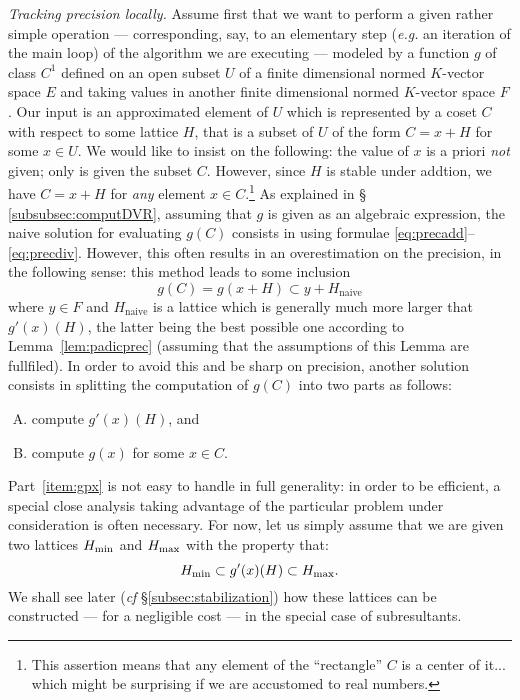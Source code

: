 \documentclass{jT}
\numberwithin{equation}{section}
\theoremstyle{definition}
\renewcommand{\min}{\text{\rm min}}
\renewcommand{\max}{\text{\rm max}}
\begin{document}
\noindent
\textit{Tracking precision locally.}
%
Assume first that we want to perform a given rather simple operation --- 
corresponding, say, to an elementary step (\emph{e.g.} an iteration of 
the main loop) of the algorithm we are executing --- modeled by a 
function $g$ of class $C^1$ defined on an open subset $U$ of a finite 
dimensional normed $K$-vector space $E$ and taking values in another 
finite dimensional normed $K$-vector space $F$.
Our input is an approximated element of $U$ which is represented 
by a coset $C$ with respect to some lattice $H$, that is a subset of $U$ 
of the form $C = x+H$ for some $x \in U$. We would like to insist on the 
following: the value of $x$ is a priori \emph{not} given; only is given 
the subset $C$. However, since $H$ is stable under addtion, we have $C = 
x+H$ for \emph{any} element $x \in C$.\footnote{This assertion means that 
any element of the ``rectangle'' $C$ is a center of it... which might be 
surprising if we are accustomed to real numbers.} As explained in \S 
\ref{subsubsec:computDVR}, assuming that $g$ is given as an algebraic 
expression, the naive solution for evaluating $g(C)$ consists in using 
formulae \eqref{eq:precadd}--\eqref{eq:precdiv}. However, this often 
results in an overestimation on the precision, in the following sense: 
this method leads to some inclusion
$$g(C) = g(x+H) \subset y + H_{\text{naive}}$$
where $y \in F$ and $H_{\text{naive}}$ is a lattice which is generally 
much more larger that $g'(x)(H)$, the latter being the best possible
one according to
Lemma~\ref{lem:padicprec} (assuming that the assumptions of this Lemma
are fullfiled). In order to avoid this and be sharp on
precision, another solution consists in splitting the computation of 
$g(C)$ into two parts as follows:
\begin{enumerate}[(A)]
\item \label{item:gpx} compute $g'(x)(H)$, and
\item \label{item:gx} compute $g(x)$ for some $x \in C$.
\end{enumerate}
Part~\eqref{item:gpx} is not easy to handle in full generality: in order 
to be efficient, a special close analysis taking advantage of the 
particular problem under consideration is often necessary. For now, let 
us simply assume that we are given two lattices $H_\min$ and $H_\max$ 
with the property that:
\begin{equation}
\label{eq:Hminmax}
H_\min \subset g'(x)(H) \subset H_\max.
\end{equation}
We shall see later (\emph{cf} \S \ref{subsec:stabilization}) how these
lattices can be constructed --- for a negligible cost --- in the special 
case of subresultants. 
\end{document}
